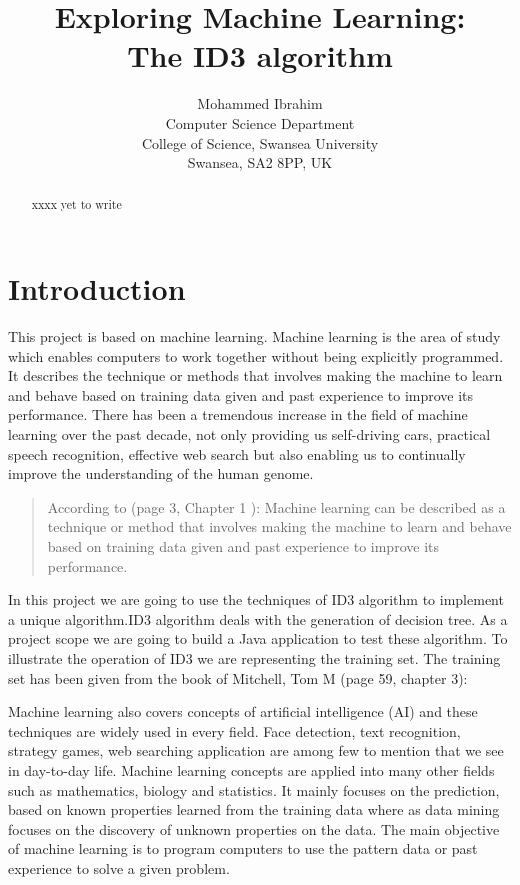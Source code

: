 \documentclass{article}
\begin{document}
\title{Exploring Machine Learning:\\
  The ID3 algorithm}

\author{Mohammed Ibrahim\\
 Computer Science Department\\
  College of Science, Swansea University\\
  Swansea, SA2 8PP, UK
}

\maketitle
\begin{abstract}
xxxx yet to write
\end{abstract}
\pagebreak
\tableofcontents
\pagebreak
\section{Introduction}
\label{sec:int}

This project is based on machine learning. Machine learning is the area of study which enables computers to work together without being explicitly programmed. It describes the technique or methods that involves making the machine to learn and behave based on training data given and past experience to improve its performance.
There has been a tremendous increase in the field of machine learning over the past decade, not only providing us self-driving cars, practical speech recognition,  effective web search but also enabling us to continually improve the understanding of the human genome. 
\begin{quote}
According to \cite{Alpaydin2010MachineLearning}(page 3, Chapter 1 ): Machine learning can be described as a technique or method that involves making the machine to learn and behave based on training data given and past experience to improve its performance. 
\end{quote}

In this project we are going to use the techniques of ID3 algorithm to implement a unique algorithm.ID3 algorithm deals with the generation of decision tree. As a project scope we are going to build a Java application to test these algorithm. To illustrate the operation of ID3 we are representing the training set. 
The training set has been given from the book of Mitchell, Tom M \cite{Mitchell1997MachineLearning}(page 59, chapter 3):


Machine learning also covers concepts of artificial intelligence (AI) and these techniques are widely used in every field. Face detection, text recognition, strategy games, web searching application are among few to mention that we see in day-to-day life. Machine learning concepts are applied into many other fields such as mathematics, biology and statistics. It mainly focuses on the prediction, based on known properties learned from the training data where as data mining focuses on the discovery of unknown properties on the data.
The main objective of machine learning is to program computers to use the pattern data or past experience to solve a given problem.
\end{document}
